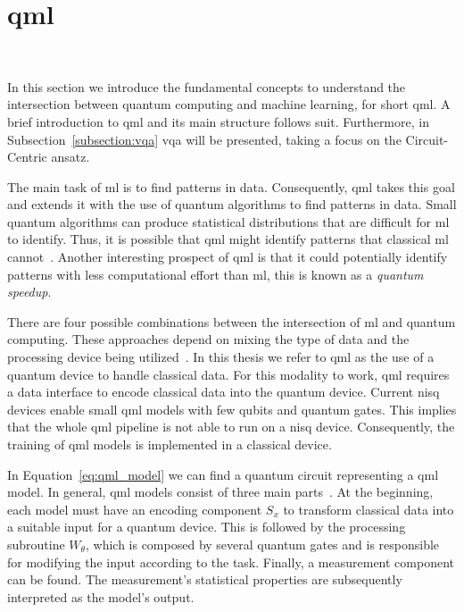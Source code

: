 
\section{\acl{qml}}\label{section:qml} \

In this section we introduce the fundamental concepts to
understand the intersection between quantum computing and
machine learning, for short \ac{qml}. A brief introduction
to \ac{qml} and its main structure follows suit. Furthermore,
in Subsection~\ref{subsection:vqa} \ac{vqa} will be presented,
taking a focus on the Circuit-Centric ansatz. \

The main task of \acf{ml} is to find patterns in data. Consequently,
\acf{qml} takes this goal and extends it with the use of quantum
algorithms to find patterns in data. Small quantum algorithms can produce
statistical distributions that are difficult for \ac{ml} to identify.
Thus, it is possible that \ac{qml} might identify patterns that
classical \ac{ml} cannot~\cite{biamonte_quantum_2017}. Another interesting
prospect of \ac{qml} is that it could potentially identify patterns with
less computational effort than \ac{ml}, this is known as a
\textit{quantum speedup}. \

There are four possible combinations between the intersection of
\ac{ml} and quantum computing. These approaches depend on mixing
the type of data and the processing device being utilized~\cite{schuld_machine_2021}.
In this thesis we refer to \ac{qml} as the use of a quantum device to
handle classical data. For this modality to work, \ac{qml} requires a data
interface to encode classical data into the quantum device. Current 
\ac{nisq} devices enable small \ac{qml} models with few qubits and
quantum gates. This implies that the whole \ac{qml} pipeline is not
able to run on a \ac{nisq} device. Consequently, the training of
\ac{qml} models is implemented in a classical device. \

In Equation~\ref{eq:qml_model} we can find a quantum circuit representing
a \ac{qml} model. In general, \ac{qml} models consist of three main parts~\cite{schuld_supervised_2021}.
At the beginning, each model must have an encoding component \(S_{x}\) to
transform classical data into a suitable input for a quantum device.
This is followed by the processing subroutine \(W_{\theta}\), which is composed
by several quantum gates and is responsible for modifying the input
according to the task. Finally, a measurement component can be found. The
measurement's statistical properties are subsequently interpreted as
the model's output. \

